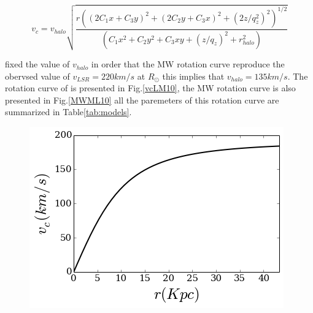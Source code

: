 \begin{equation}
v_c = v_{halo} \sqrt{ \dfrac{r((2C_1x + C_3 y)^2 + (2C_2y + C_3x)^2 + (2z/q_z^2)^2)^{1/2}}{(C_1 x^2 + C_2 y^2 + C_3 x y + (z/q_z)^2 + r_{halo}^2)} }
\end{equation}

\citep{LM10} fixed the value of $v_{halo}$ in order that the MW rotation curve reproduce the obervsed value of $v_{LSR}= 220 km/s$ at $R_{\odot}$
this implies that $v_{halo} = 135 km/s$. The rotation curve of is presented in Fig.\ref{vcLM10}, the MW rotation curve is also presented in
Fig.\ref{MWML10} all the paremeters of this rotation curve are summarized in Table\ref{tab:models}.

\begin{figure}[H]\label{fig:vcLM10}
\includegraphics[scale=0.7]{../figures/vcLM10.png}
\end{figure}

